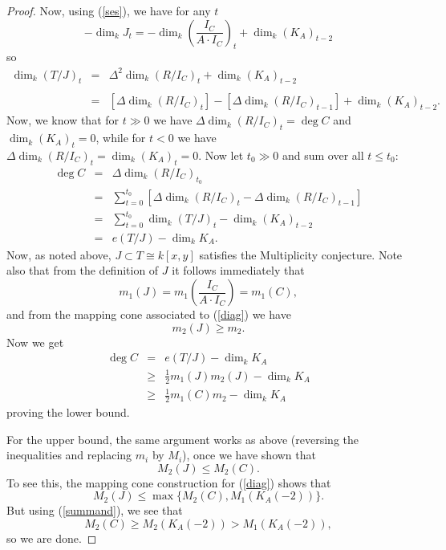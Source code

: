 \documentclass[12pt,twoside]{amsart}
\numberwithin{equation}{section}
\theoremstyle{definition}
\begin{document}
\begin{proof}
\bigskip




Now, using (\ref{ses}), we have for any $t$
\[
-\dim_k  J_t = - \dim_k \left ( \frac{I_C}{A \cdot I_C} \right )_{t} + \dim_k (K_A)_{t-2}
\]
so
\[
\begin{array}{rcl}
\dim_k (T/J)_t & = & \Delta^2 \dim_k (R/I_C)_t  + \dim_k (K_A)_{t-2} \\ \\
& = & [\Delta \dim_k (R/I_C)_t] - [\Delta \dim_k (R/I_C)_{t-1}] + \dim_k (K_A)_{t-2}.
\end{array}
\]
Now, we know that for $t \gg 0$ we have $\Delta \dim_k (R/I_C)_t = \deg C$ and $\dim_k
(K_A)_t = 0$, while for $t < 0$ we have $\Delta \dim_k (R/I_C)_t = \dim_k (K_A)_t = 0$.
Now let $t_0 \gg 0$ and sum over all $t \leq t_0$:
\begin{equation} \label{important computation}
\begin{array}{rcl}
\deg C & = & \Delta \dim_k (R/I_C)_{t_0} \\
& = & \displaystyle \sum_{t=0}^{t_0} [\Delta \dim_k(R/I_C)_t - \Delta \dim_k
(R/I_C)_{t-1}]
\\ & = & \displaystyle \sum_{t=0}^{t_0} \dim_k (T/ J)_t - \dim_k (K_A)_{t-2} \\
& = & e (T/ J) - \dim_k K_A .
\end{array}
\end{equation}
Now, as noted above, $ J \subset T \cong k[x,y]$ satisfies the Multiplicity conjecture.
Note also that from the definition of $J$ it follows immediately that
\[
m_1(J) = m_1\left ( \frac{I_C}{A \cdot I_C} \right ) = m_1(C),
\]
and from the mapping cone associated to (\ref{diag}) we have
\[
m_2(J) \geq m_2.
\]
  Now we get
\[
\begin{array}{rcl}
\deg C & =  & e (T/ J) - \dim_k K_A \\[2pt]
& \geq & \frac{1}{2} m_1( J) m_2( J) - \dim_k K_A \\[2pt]
& \geq & \frac{1}{2} m_1(C) m_2 - \dim_k K_A
\end{array}
\]
proving the lower bound.

For the upper bound, the same argument works as above (reversing the inequalities and replacing $m_i$ by $M_i$), once we have shown that
\[
M_2(J) \leq M_2(C).
\]
To see this, the mapping cone construction for (\ref{diag}) shows that
\[
M_2(J) \leq \max \{ M_2(C), M_1(K_A(-2)) \}.
\]
But using (\ref{summand}), we see that
\[
M_2(C) \geq M_2(K_A(-2)) > M_1(K_A(-2)),
\]
so we are done.
\end{proof}
\end{document}
